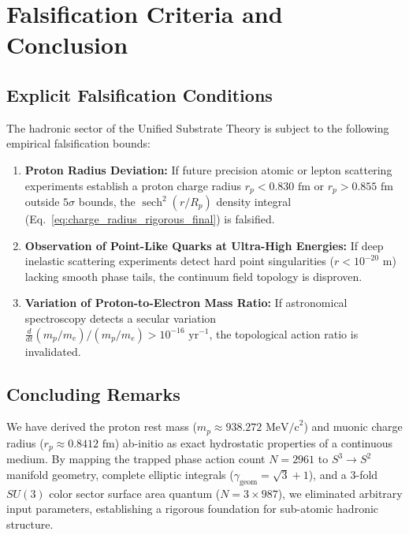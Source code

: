 \documentclass[11pt,a4paper]{article}
\begin{document}
	\section{Falsification Criteria and Conclusion}
	\label{sec:falsification}
	
	\subsection{Explicit Falsification Conditions}
	The hadronic sector of the Unified Substrate Theory is subject to the following empirical falsification bounds:
	\begin{enumerate}
		\item \textbf{Proton Radius Deviation:} If future precision atomic or lepton scattering experiments establish a proton charge radius $r_p < 0.830 \text{ fm}$ or $r_p > 0.855 \text{ fm}$ outside $5\sigma$ bounds, the $\operatorname{sech}^2(r/R_p)$ density integral (Eq.\ \eqref{eq:charge_radius_rigorous_final}) is falsified.
		\item \textbf{Observation of Point-Like Quarks at Ultra-High Energies:} If deep inelastic scattering experiments detect hard point singularities ($r < 10^{-20} \text{ m}$) lacking smooth phase tails, the continuum field topology is disproven.
		\item \textbf{Variation of Proton-to-Electron Mass Ratio:} If astronomical spectroscopy detects a secular variation $\frac{d}{dt}(m_p / m_e) / (m_p / m_e) > 10^{-16} \text{ yr}^{-1}$, the topological action ratio is invalidated.
	\end{enumerate}
	
	\subsection{Concluding Remarks}
	We have derived the proton rest mass ($m_p \approx 938.272 \text{ MeV/c}^2$) and muonic charge radius ($r_p \approx 0.8412 \text{ fm}$) ab-initio as exact hydrostatic properties of a continuous medium. By mapping the trapped phase action count $N = 2961$ to $S^3 \to S^2$ manifold geometry, complete elliptic integrals ($\gamma_{\text{geom}} = \sqrt{3}+1$), and a 3-fold $SU(3)$ color sector surface area quantum ($N = 3 \times 987$), we eliminated arbitrary input parameters, establishing a rigorous foundation for sub-atomic hadronic structure.
	
\end{document}
